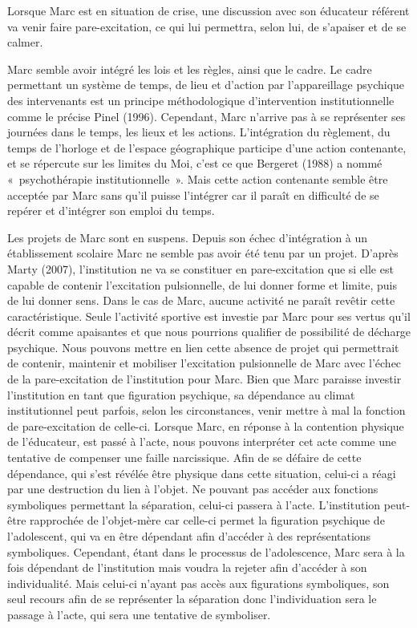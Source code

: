 \documentclass[12pt, a4paper]{book}
\begin{document}
\begin{spacing}{1.5}
Lorsque Marc est en situation de crise, une discussion avec son éducateur référent va venir faire pare-excitation, ce qui lui permettra, selon lui, de s'apaiser et de se calmer.

Marc semble avoir intégré les lois et les règles, ainsi que le cadre. Le cadre permettant un système de temps, de lieu et d'action par l'appareillage psychique des intervenants est un principe méthodologique d'intervention institutionnelle comme le précise Pinel (1996). Cependant, Marc n'arrive pas à se représenter ses journées dans le temps, les lieux et les actions. L'intégration  du règlement, du temps de l'horloge et de l'espace géographique participe d'une action contenante, et se répercute sur les limites du Moi, c'est ce que Bergeret (1988) a nommé « psychothérapie institutionnelle ». Mais  cette action contenante semble être acceptée par Marc sans qu'il puisse l'intégrer car il paraît en difficulté de se repérer et d'intégrer son emploi du temps. 

Les projets de Marc sont en suspens. Depuis son échec d'intégration à un établissement scolaire Marc ne semble pas avoir été tenu par un projet. D'après Marty (2007), l'institution ne va se constituer en pare-excitation que si elle est capable de contenir l'excitation pulsionnelle, de lui donner forme et limite, puis de lui donner sens. Dans le cas de Marc, aucune activité ne paraît revêtir cette caractéristique. Seule l'activité sportive est investie par Marc pour ses vertus qu'il décrit comme apaisantes et que nous pourrions qualifier de possibilité de décharge psychique. Nous pouvons mettre en lien cette absence de projet qui permettrait de contenir, maintenir et mobiliser l'excitation pulsionnelle de Marc avec l'échec de la pare-excitation de l'institution pour Marc. Bien que Marc paraisse investir l'institution en tant que figuration psychique, sa dépendance au climat institutionnel peut parfois, selon les circonstances, venir  mettre à mal  la fonction de pare-excitation de celle-ci. Lorsque Marc, en réponse à la contention physique de l'éducateur, est passé à l'acte, nous pouvons interpréter cet acte comme  une tentative de compenser une faille narcissique. Afin de se défaire de cette dépendance, qui s'est révélée être physique dans cette situation, celui-ci  a réagi par une destruction du lien à l'objet. Ne pouvant pas accéder aux fonctions symboliques permettant la séparation, celui-ci passera à l'acte. L'institution peut-être rapprochée de l'objet-mère car celle-ci permet la figuration psychique de l'adolescent, qui va en être dépendant afin d'accéder à des représentations symboliques. Cependant, étant dans le processus de l'adolescence, Marc sera à la fois dépendant de l'institution mais voudra la rejeter afin d'accéder à son individualité. Mais celui-ci n'ayant pas accès aux figurations symboliques, son seul recours afin de se représenter la séparation donc l'individuation sera le passage à l'acte, qui sera une tentative de symboliser.


\end{spacing}
\end{document}
